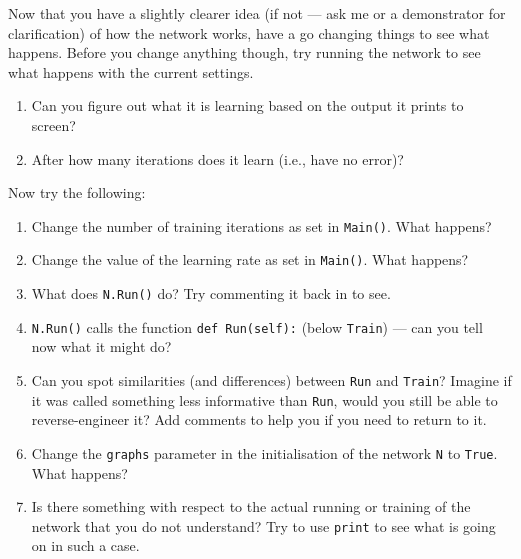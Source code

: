 \documentclass[a4paper,10pt]{article}
\begin{document}
Now that you have a slightly clearer idea (if not --- ask me or a demonstrator for clarification) of how the network works, have a go changing things to see what happens. Before you change anything though, try running the network to see what happens with the current settings.

\begin{enumerate}
 \item Can you figure out what it is learning based on the output it prints to screen?

 \item After how many iterations does it learn (i.e., have no error)?
\end{enumerate}

Now try the following:

\begin{enumerate}
 \item Change the number of training iterations as set in \texttt{Main()}. What happens?
 \item Change the value of the learning rate as set in \texttt{Main()}. What happens?
 \item What does \texttt{N.Run()} do? Try commenting it back in to see.
 \item \texttt{N.Run()} calls the function \texttt{def Run(self):} (below \texttt{Train}) --- can you tell now what it might do?
 \item Can you spot similarities (and differences) between \texttt{Run} and \texttt{Train}? Imagine if it was called something less informative than  \texttt{Run}, would you still be able to reverse-engineer it? Add comments to help you if you need to return to it.
 \item Change the \texttt{graphs} parameter in the initialisation of the network \texttt{N} to \texttt{True}. What happens?
 \item Is there something with respect to the actual running or training of the network that you do not understand? Try to use \texttt{print} to see what is going on in such a case.
\end{enumerate}
\end{document}
